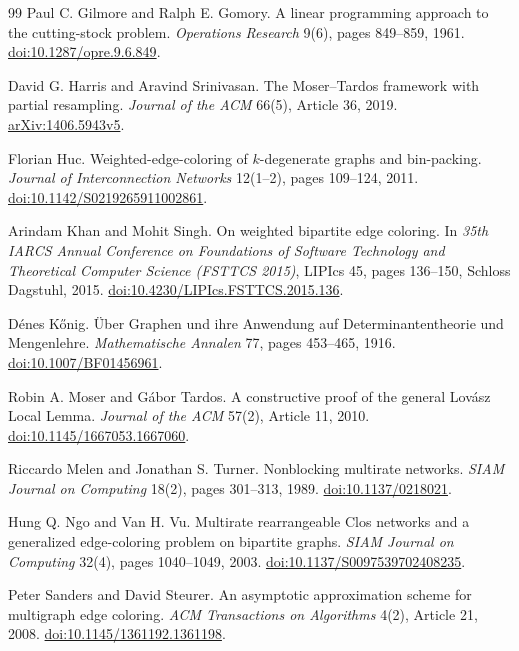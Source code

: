 \documentclass[11pt]{article}
\theoremstyle{definition}\newtheorem{algorithm}{Algorithm}[section]
\numberwithin{equation}{section}
\theoremstyle{remark}\newtheorem*{remark}{Remark}
\begin{document}
\begin{thebibliography}{99}
 Paul C. Gilmore and Ralph E. Gomory.
A linear programming approach to the cutting-stock problem.
\emph{Operations Research} 9(6), pages 849--859, 1961.
\href{https://doi.org/10.1287/opre.9.6.849}{doi:10.1287/opre.9.6.849}.

 David G. Harris and Aravind Srinivasan.
The Moser--Tardos framework with partial resampling.
\emph{Journal of the ACM} 66(5), Article 36, 2019.
\href{https://arxiv.org/html/1406.5943v5}{arXiv:1406.5943v5}.

 Florian Huc.
Weighted-edge-coloring of $k$-degenerate graphs and bin-packing.
\emph{Journal of Interconnection Networks} 12(1--2), pages 109--124, 2011.
\href{https://doi.org/10.1142/S0219265911002861}{doi:10.1142/S0219265911002861}.

 Arindam Khan and Mohit Singh.
On weighted bipartite edge coloring.
In \emph{35th IARCS Annual Conference on Foundations of Software Technology
and Theoretical Computer Science (FSTTCS 2015)}, LIPIcs 45, pages 136--150,
Schloss Dagstuhl, 2015.
\href{https://doi.org/10.4230/LIPIcs.FSTTCS.2015.136}{doi:10.4230/LIPIcs.FSTTCS.2015.136}.

 D\'enes K\H{o}nig.
\"Uber Graphen und ihre Anwendung auf Determinantentheorie und Mengenlehre.
\emph{Mathematische Annalen} 77, pages 453--465, 1916.
\href{https://doi.org/10.1007/BF01456961}{doi:10.1007/BF01456961}.

 Robin A. Moser and G\'abor Tardos.
A constructive proof of the general Lov\'asz Local Lemma.
\emph{Journal of the ACM} 57(2), Article 11, 2010.
\href{https://doi.org/10.1145/1667053.1667060}{doi:10.1145/1667053.1667060}.

 Riccardo Melen and Jonathan S. Turner.
Nonblocking multirate networks.
\emph{SIAM Journal on Computing} 18(2), pages 301--313, 1989.
\href{https://doi.org/10.1137/0218021}{doi:10.1137/0218021}.

 Hung Q. Ngo and Van H. Vu.
Multirate rearrangeable Clos networks and a generalized edge-coloring
problem on bipartite graphs.
\emph{SIAM Journal on Computing} 32(4), pages 1040--1049, 2003.
\href{https://doi.org/10.1137/S0097539702408235}{doi:10.1137/S0097539702408235}.

 Peter Sanders and David Steurer.
An asymptotic approximation scheme for multigraph edge coloring.
\emph{ACM Transactions on Algorithms} 4(2), Article 21, 2008.
\href{https://doi.org/10.1145/1361192.1361198}{doi:10.1145/1361192.1361198}.


\end{thebibliography}
\end{document}
